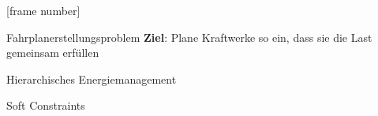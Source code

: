 

{

[frame number]{}



\begin{frame}{Fahrplanerstellungsproblem}
\textbf{Ziel}: Plane Kraftwerke so ein, dass sie die \alert{Last} gemeinsam erfüllen

\end{frame}
}


\begin{frame}{Hierarchisches Energiemanagement} \large

\begin{figure}
\centering

\label{fig:hierarchical-decomposition}
\end{figure}
\end{frame}


\begin{frame}{Soft Constraints} \large
\begin{figure}
\centering

\end{figure}
\vspace*{-2.4ex}
\end{frame}

